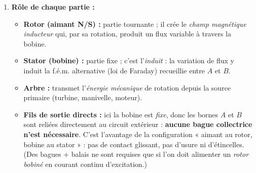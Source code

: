 \documentclass[11pt]{article}
\begin{document}
\begin{corrige}
\begin{enumerate}
\item \textbf{Rôle de chaque partie :}
\begin{itemize}
\item \textbf{Rotor (aimant N/S) :} partie tournante ; il crée le \emph{champ magnétique inducteur} qui, par sa rotation, produit un flux variable à travers la bobine.
\item \textbf{Stator (bobine) :} partie fixe ; c'est l'\emph{induit} : la variation de flux y induit la f.é.m. alternative (loi de Faraday) recueillie entre $A$ et $B$.
\item \textbf{Arbre :} transmet l'\emph{énergie mécanique} de rotation depuis la source primaire (turbine, manivelle, moteur).
\item \textbf{Fils de sortie directs :} ici la bobine est \emph{fixe}, donc les bornes $A$ et $B$ sont reliées directement au circuit extérieur : \textbf{aucune bague collectrice n'est nécessaire}. C'est l'avantage de la configuration « aimant au rotor, bobine au stator » : pas de contact glissant, pas d'usure ni d'étincelles. (Des bagues + balais ne sont requises que si l'on doit alimenter un \emph{rotor bobiné} en courant continu d'excitation.)
\end{itemize}
\end{enumerate}
\end{corrige}
\end{document}
